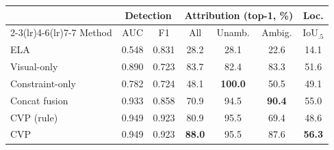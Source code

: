 \begin{tabular}{lcccccc}
\toprule
 & \multicolumn{2}{c}{Detection} & \multicolumn{3}{c}{Attribution (top-1, \%)} & Loc.\\
\cmidrule(lr){2-3}\cmidrule(lr){4-6}\cmidrule(lr){7-7}
Method & AUC & F1 & All & Unamb. & Ambig. & IoU$_{.5}$\\
\midrule
ELA & 0.548 & 0.831 & 28.2 & 28.1 & 22.6 & 14.1\\
Visual-only & 0.890 & 0.723 & 83.7 & 82.4 & 83.3 & 51.6\\
Constraint-only & 0.782 & 0.724 & 48.1 & \textbf{100.0} & 50.5 & 49.1\\
Concat fusion & 0.933 & 0.858 & 70.9 & 94.5 & \textbf{90.4} & 55.0\\
CVP (rule) & 0.949 & 0.923 & 80.9 & 95.5 & 69.4 & 48.6\\
CVP & 0.949 & 0.923 & \textbf{88.0} & 95.5 & 87.6 & \textbf{56.3}\\
\bottomrule
\end{tabular}
